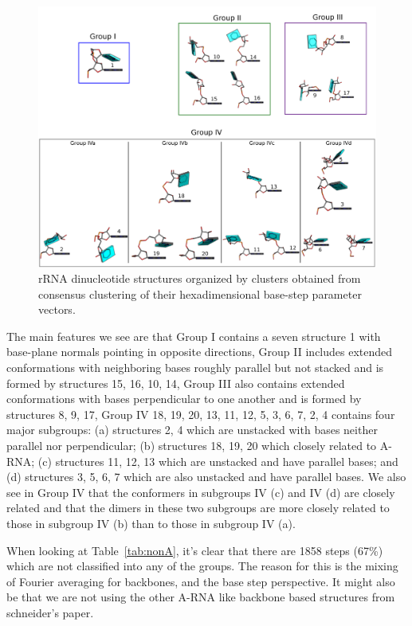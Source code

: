 \begin{figure}[htbp]
 \centering
\includegraphics[angle=90, scale=0.5]{Chapter2/collageb.png}
 \caption{rRNA dinucleotide structures organized by clusters obtained from
consensus clustering of their hexadimensional base-step parameter vectors.}
 \label{fig:nonAclus}
\end{figure}


The main features we see are that Group I contains a seven structure
{1} with base-plane normals  pointing in opposite directions, Group II
includes  extended   conformations  with  neighboring   bases  roughly
parallel but not stacked and is formed by structures {15, 16, 10, 14},
Group   III   also   contains   extended  conformations   with   bases
perpendicular to one  another and is formed by  structures {8, 9, 17},
Group IV  {18, 19, 20,  13, 11, 12,  5, 3, 6,  7, 2, 4}  contains four
major subgroups: (a) structures {2,  4} which are unstacked with bases
neither parallel nor perpendicular;  (b) structures {18, 19, 20} which
closely  related to  A-RNA;  (c)  structures {11,  12,  13} which  are
unstacked and  have parallel  bases; and (d)  structures {3, 5,  6, 7}
which are also unstacked and have parallel bases. We also see in Group
IV that  the conformers  in subgroups  IV (c) and  IV (d)  are closely
related and  that the dimers in  these two subgroups  are more closely
related to those in subgroup IV (b) than to those in subgroup IV (a).


When looking at Table~\ref{tab:nonA}, it's clear that there are 1858
steps (67\%) which are not classified into any of the groups. The reason for
this is the mixing of Fourier averaging for backbones, and the
base step perspective. It might also be that we are not using the
other A-RNA like backbone based structures from schneider's paper.

